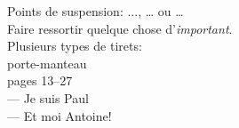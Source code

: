 Points de suspension: ..., …
ou \ldots\\

Faire ressortir quelque chose
d'\emph{important}.\\

Plusieurs types de tirets:\\
porte-manteau\\
pages 13--27\\
--- Je suis Paul\\
--- Et moi Antoine!
